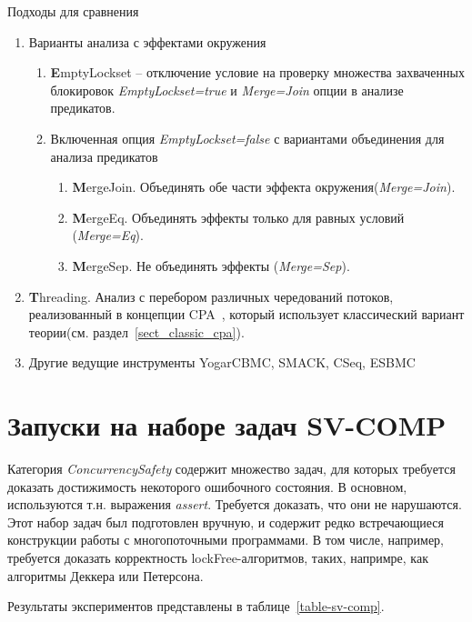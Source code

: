 Подходы для сравнения
\begin{enumerate}
\item Варианты анализа с эффектами окружения
\begin{enumerate}
\item {\textbf EmptyLockset} -- отключение условие на проверку множества захваченных блокировок {\em EmptyLockset=true} и {\em Merge=Join} опции в анализе предикатов.
\item Включенная опция {\em EmptyLockset=false} с вариантами объединения для анализа предикатов
\begin{enumerate}
\item {\textbf MergeJoin}. Объединять обе части эффекта окружения({\em Merge=Join}). 
\item {\textbf MergeEq}. Объединять эффекты только для равных условий ({\em Merge=Eq}).
\item {\textbf MergeSep}. Не объединять эффекты ({\em Merge=Sep}). 
\end{enumerate}
\end{enumerate}
\item {\textbf Threading}. Анализ с перебором различных чередований потоков, реализованный в концепции CPA~\cite{MEMICS16-Multi-Threaded}, который использует классический вариант теории(см. раздел~\ref{sect_classic_cpa}).
\item Другие ведущие инструменты YogarCBMC, SMACK, CSeq, ESBMC
\end{enumerate}

\section{Запуски на наборе задач SV-COMP}
Категория {\em ConcurrencySafety} содержит множество задач, для которых требуется доказать достижимость некоторого ошибочного состояния. 
В основном, используются т.н. выражения \textit{assert}. Требуется доказать, что они не нарушаются. 
Этот набор задач был подготовлен вручную, и содержит редко встречающиеся конструкции работы с многопоточными программами. В том числе, например, требуется доказать корректность lockFree-алгоритмов, таких, напримре, как алгоритмы Деккера или Петерсона.

Результаты экспериментов представлены в таблице~\ref{table-sv-comp}.


